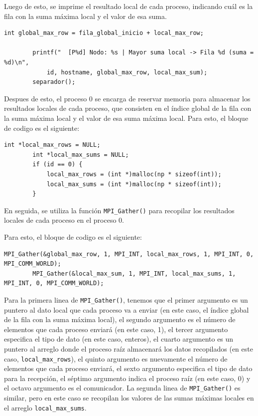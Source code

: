 \documentclass[letterpaper,11pt]{article}
\begin{document}
    Luego de esto, se imprime el resultado local de cada proceso, indicando cuál es la fila con la suma máxima local y el valor de esa suma.

    \begin{lstlisting}[style=cstyle,caption={Impresion de resultado local de cada proceso},label={lst:programa-b}]
        int global_max_row = fila_global_inicio + local_max_row;

        printf("  [P%d] Nodo: %s | Mayor suma local -> Fila %d (suma = %d)\n",
            id, hostname, global_max_row, local_max_sum);
        separador();
    \end{lstlisting}

    Despues de esto, el proceso 0 se encarga de reservar memoria para almacenar los resultados locales de cada proceso, que consisten en el índice global de la fila con la suma máxima local y el valor de esa suma máxima local.
    Para esto, el bloque de codigo es el siguiente:

    \begin{lstlisting}[style=cstyle,caption={Reserva de memoria para resultados locales en proceso 0},label={lst:programa-b}]
        int *local_max_rows = NULL;
        int *local_max_sums = NULL;
        if (id == 0) {
            local_max_rows = (int *)malloc(np * sizeof(int));
            local_max_sums = (int *)malloc(np * sizeof(int));
        }
    \end{lstlisting}

    En seguida, se utiliza la función \texttt{MPI\_Gather()} para recopilar los resultados locales de cada proceso en el proceso 0.
    
    Para esto, el bloque de codigo es el siguiente:

    \begin{lstlisting}[style=cstyle,caption={Recopilacion de resultados locales con MPI\_Gather},label={lst:programa-b}]
        MPI_Gather(&global_max_row, 1, MPI_INT, local_max_rows, 1, MPI_INT, 0, MPI_COMM_WORLD);
        MPI_Gather(&local_max_sum, 1, MPI_INT, local_max_sums, 1, MPI_INT, 0, MPI_COMM_WORLD);
    \end{lstlisting}

    Para la primera linea de \texttt{MPI\_Gather()}, tenemos que el primer argumento es un puntero al dato local que cada proceso va a enviar (en este caso, el índice global de la fila con la suma máxima local), el segundo argumento es el número de elementos que cada proceso enviará (en este caso, 1), el tercer argumento especifica el tipo de dato (en este caso, enteros), el cuarto argumento es un puntero al arreglo donde el proceso raíz almacenará los datos recopilados (en este caso, \texttt{local\_max\_rows}), el quinto argumento es nuevamente el número de elementos que cada proceso enviará, el sexto argumento especifica el tipo de dato para la recepción, el séptimo argumento indica el proceso raíz (en este caso, 0) y el octavo argumento es el comunicador.
    La segunda linea de \texttt{MPI\_Gather()} es similar, pero en este caso se recopilan los valores de las sumas máximas locales en el arreglo \texttt{local\_max\_sums}.
\end{document}

